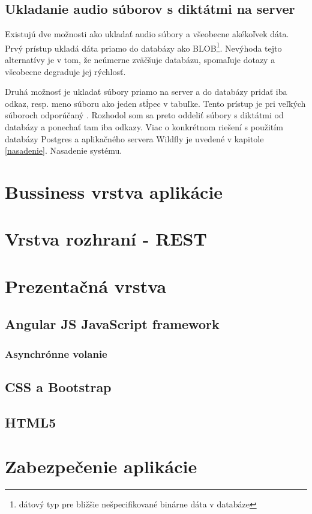 \documentclass[12pt,oneside]{fithesis2}
\begin{document}
      \subsection{Ukladanie audio súborov s diktátmi na server} \label{ukladanie}
      \par Existujú dve možnosti ako ukladať audio súbory a všeobecne akékoľvek dáta. Prvý prístup ukladá dáta priamo do databázy ako BLOB\footnote{dátový typ pre bližšie nešpecifikované binárne dáta v databáze}. Nevýhoda tejto alternatívy je v tom, že neúmerne zväčšuje databázu, spomaľuje dotazy a všeobecne degraduje jej rýchlosť.
      \par Druhá možnosť je ukladať súbory priamo na server a do databázy pridať iba odkaz, resp. meno súboru ako jeden stĺpec v tabuľke. Tento prístup je pri veľkých súboroch odporúčaný \cite{sof1}. Rozhodol som sa preto oddeliť súbory s diktátmi od databázy a ponechať tam iba odkazy. Viac o konkrétnom riešení s použitím databázy Postgres a aplikačného servera Wildfly je uvedené v kapitole \ref{nasadenie}. Nasadenie systému.
      \section{Bussiness vrstva aplikácie}
      \section{Vrstva rozhraní - REST}
      \section{Prezentačná vrstva}
      		\subsection{Angular JS JavaScript framework}
			\subsubsection{Asynchrónne volanie }
      		\subsection{CSS a Bootstrap}
      		\subsection{HTML5}
      		\pagebreak
      \section{Zabezpečenie aplikácie}
\end{document}
